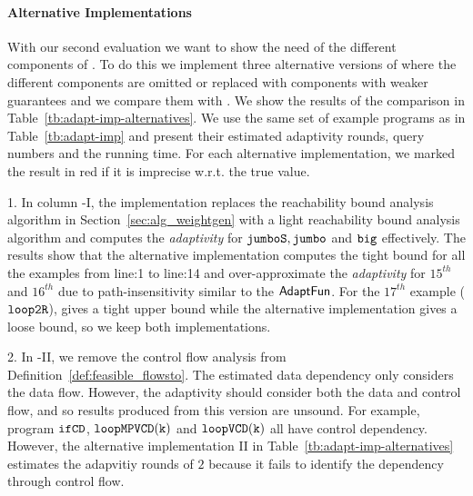 \paragraph{Alternative Implementations}

With our second evaluation we want to show the need of the different
components of {\THESYSTEM}. To do this we implement three alternative
versions of {\THESYSTEM} where the different components are omitted or
replaced with components with weaker guarantees and we compare them with {\THESYSTEM}. We show the
results  of the comparison in
Table~\ref{tb:adapt-imp-alternatives}. We use the same set of example programs as in
Table~\ref{tb:adapt-imp} and present their estimated adaptivity
rounds, query numbers and the running time.  For each alternative
implementation, we marked the result in red if it is imprecise
w.r.t. the true value.

1. In column {\THESYSTEM}-I, the implementation replaces the reachability bound analysis algorithm in Section~\ref{sec:alg_weightgen} with a light reachability bound analysis algorithm and computes the \emph{adaptivity} for
$\mathtt{jumboS}, \mathtt{jumbo}$ and $\mathtt{big}$ effectively.
The results show that the alternative implementation computes the tight bound for all the examples from line:1 to line:14
and over-approximate the \emph{adaptivity} for $15^{th}$ and $16^{th}$ due to path-insensitivity similar to the
$\textsf{AdaptFun}$.
For the $17^{th}$ example ($\mathtt{loop2R}$), {\THESYSTEM} gives a tight upper bound while the alternative implementation gives a loose bound, so we keep both implementations.

2. In {\THESYSTEM}-II, we remove the control flow analysis from Definition~\ref{def:feasible_flowsto}.
The estimated data dependency only considers the data flow.
However, the adaptivity should consider both the data and control flow, and so results produced from this version are unsound.
For example, program $\mathtt{ifCD}$, $ \mathtt{loopMPVCD(k)} $ and $\mathtt{loopVCD(k)} $ all have control dependency.
However, the alternative implementation II in Table~\ref{tb:adapt-imp-alternatives} estimates the adapvitiy rounds of $2$ because it fails to identify the dependency through control flow.


